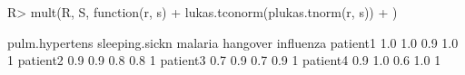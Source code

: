 \begin{Schunk}
% --begin: "comp.mult"
\begin{Sinput}
R> mult(R, S, function(r, s) {
+      lukas.tconorm(plukas.tnorm(r, s))
+  })
\end{Sinput}
\begin{Soutput}
         pulm.hypertens sleeping.sickn malaria hangover influenza
patient1            1.0            1.0     0.9      1.0         1
patient2            0.9            0.9     0.8      0.8         1
patient3            0.7            0.9     0.7      0.9         1
patient4            0.9            1.0     0.6      1.0         1
\end{Soutput}
%
% --end: "comp.mult"
\end{Schunk}
